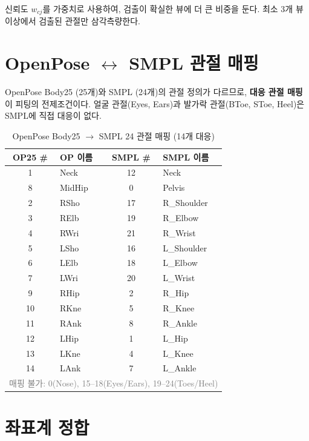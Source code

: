 \documentclass[11pt, a4paper]{report}
\begin{document}
신뢰도 $w_{cj}$를 가중치로 사용하여, 검출이 확실한 뷰에 더 큰 비중을 둔다.
최소 3개 뷰 이상에서 검출된 관절만 삼각측량한다.


\section{OpenPose $\leftrightarrow$ SMPL 관절 매핑}

\begin{keyidea}
OpenPose Body25 (25개)와 SMPL (24개)의 관절 정의가 다르므로,
\textbf{대응 관절 매핑}이 피팅의 전제조건이다.
얼굴 관절(Eyes, Ears)과 발가락 관절(BToe, SToe, Heel)은 SMPL에 직접 대응이 없다.
\end{keyidea}

\begin{table}[H]
\centering
\caption{OpenPose Body25 $\rightarrow$ SMPL 24 관절 매핑 (14개 대응)}
\label{tab:joint_mapping}
\renewcommand{\arraystretch}{1.3}
\begin{tabular}{clcl}
\toprule
\textbf{OP25 \#} & \textbf{OP 이름} & \textbf{SMPL \#} & \textbf{SMPL 이름} \\
\midrule
1 & Neck & 12 & Neck \\
8 & MidHip & 0 & Pelvis \\
2 & RSho & 17 & R\_Shoulder \\
3 & RElb & 19 & R\_Elbow \\
4 & RWri & 21 & R\_Wrist \\
5 & LSho & 16 & L\_Shoulder \\
6 & LElb & 18 & L\_Elbow \\
7 & LWri & 20 & L\_Wrist \\
9 & RHip & 2 & R\_Hip \\
10 & RKne & 5 & R\_Knee \\
11 & RAnk & 8 & R\_Ankle \\
12 & LHip & 1 & L\_Hip \\
13 & LKne & 4 & L\_Knee \\
14 & LAnk & 7 & L\_Ankle \\
\midrule
\multicolumn{4}{l}{\textcolor{gray}{매핑 불가: 0(Nose), 15--18(Eyes/Ears), 19--24(Toes/Heel)}} \\
\bottomrule
\end{tabular}
\end{table}


\section{좌표계 정합}
\end{document}
